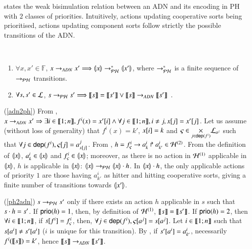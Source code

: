  states the weak bisimulation relation between an ADN and its encoding in
PH with $2$ classes of priorities.
Intuitively, actions updating cooperative sorts being prioritised, actions updating component
sorts follow strictly the possible transitions of the ADN.

\begin{theorem}[$\DNdef \approx \toPH\DNdef$]~
\label{th:bisimDN}
  \begin{enumerate}
    \item \label{adn2ph} $\forall x,x'\in\mathbb F$,
      $x\rightarrow_{ADN} x' \Longrightarrow \llparenthesis x\rrparenthesis \rightarrow_{\mathcal{PH}}^* \llparenthesis x'\rrparenthesis$,
      where $\rightarrow_{\mathcal{PH}}^*$ is a finite sequence of $\rightarrow_{\mathcal{PH}}$ transitions.

    \item \label{ph2adn} $\forall s,s'\in \mathcal{L}$,
      $s\rightarrow_{\mathcal{PH}} s' \Longrightarrow \llbracket s\rrbracket = \llbracket s'\rrbracket \vee \llbracket s\rrbracket \rightarrow_{ADN}
      \llbracket s'\rrbracket\enspace.$
  \end{enumerate}
\end{theorem}
%
\begin{proofbisimADN}
(\ref{adn2ph}) From , $x\rightarrow_{ADN} x'\Rightarrow \exists i\in\llbracket 1; n \rrbracket,
f^i(x)=x'[{i}] \wedge \forall j\in\llbracket 1; n \rrbracket,i\neq j, x[{j}]=x'[{j}]$.
Let us assume (without loss of generality) that $f^i(x)=k'$, $x[{i}]=k$ and
$\varsigma\in\underset{j\in\mathsf{dep}(f^i)}{\times} \mathcal{L}_{a^j}$ such that
$\forall j\in\mathsf{dep}(f^i), \varsigma[{j}]=a^j_{x[{j}]}$.
From , $h=f^i_\varsigma\rightarrow a^i_k\Rsh a^i_{k'}\in\mathcal{H}^{(2)}$.
From the definition of $\llparenthesis x\rrparenthesis$,
$a^i_k\in \llparenthesis x\rrparenthesis$ and $f^i_\varsigma\in \llparenthesis x\rrparenthesis$;
moreover, as there is no action in $\mathcal{H}^{(1)}$ applicable in $\llparenthesis x\rrparenthesis$,
$h$ is applicable in $\llparenthesis x\rrparenthesis$:
$\llparenthesis x\rrparenthesis\rightarrow_{\mathcal{PH}} \llparenthesis x\rrparenthesis\cdot h$.
In $\llparenthesis x\rrparenthesis\cdot h$, the only applicable actions of priority $1$ are those having
$a^i_{k'}$ as hitter and hitting cooperative sorts, giving a finite number of transitions towards
$\llparenthesis x'\rrparenthesis$.

(\ref{ph2adn}) $s\rightarrow_{\mathcal{PH}} s'$ only if there exists an action $h$ applicable in $s$ such that
$s\cdot h=s'$.
If $\mathsf{prio}(h)=1$, then, by definition of $\mathcal{H}^{(1)}$, 
$\llbracket s\rrbracket=\llbracket s'\rrbracket$.
If $\mathsf{prio}(h)=2$, then $\forall i\in\llbracket 1; n \rrbracket$,
if $s[{f^i}] = f^i_\varsigma$, then, $\forall j\in\mathsf{dep}(f^i),
\varsigma[{a^j}]=s[{a^j}]$.
Let $i\in\llbracket 1; n \rrbracket$ such that $s[{a^i}]\neq s'[{a^i}]$ ($i$ is unique for this
transition).
By , if $s'[{a^i}]=a^i_{k'}$, necessarily $f^i(\llbracket s\rrbracket)=k'$, hence
$\llbracket s\rrbracket\rightarrow_{ADN} \llbracket s'\rrbracket$.
\end{proofbisimADN}
